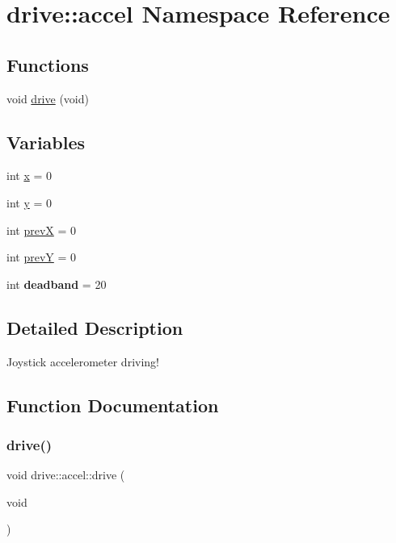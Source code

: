 \hypertarget{namespacedrive_1_1accel}{}\section{drive\+:\+:accel Namespace Reference}
\label{namespacedrive_1_1accel}
\subsection*{Functions}
\begin{DoxyCompactItemize}
\item 
void \hyperlink{namespacedrive_1_1accel_a6d0c42c5e3f1ff1db68617de9d4b1758}{drive} (void)
\end{DoxyCompactItemize}
\subsection*{Variables}
\begin{DoxyCompactItemize}
\item 
int \hyperlink{namespacedrive_1_1accel_ac04cdc79ef60e183664808e63c64204a}{x} = 0
\item 
int \hyperlink{namespacedrive_1_1accel_ab30da3026058091c6ee42e12c4e62432}{y} = 0
\item 
int \hyperlink{namespacedrive_1_1accel_aff072ce199309a54b7bc8e3f80f6e15c}{prevX} = 0
\item 
int \hyperlink{namespacedrive_1_1accel_ae0f4ef2b1c049d481f496d680dd3f9bd}{prevY} = 0
\item 
\mbox{\label{namespacedrive_1_1accel_a14bc27053dde38ad7e09e8bb78c44d1a}} 
int {\bfseries deadband} = 20
\end{DoxyCompactItemize}


\subsection{Detailed Description}
Joystick accelerometer driving! 

\subsection{Function Documentation}
\mbox{\label{namespacedrive_1_1accel_a6d0c42c5e3f1ff1db68617de9d4b1758}} 
\subsubsection{\texorpdfstring{drive()}{drive()}}
{\footnotesize\ttfamily void drive\+::accel\+::drive (\begin{DoxyParamCaption}\item[{void}]{ }\end{DoxyParamCaption})}

